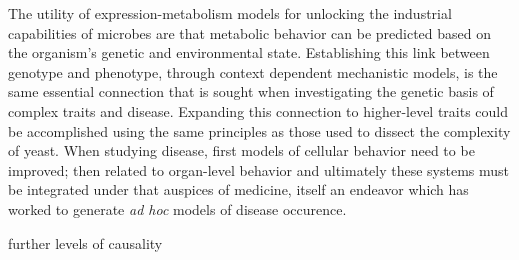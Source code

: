 The utility of expression-metabolism models for unlocking the industrial capabilities of microbes are that metabolic behavior can be predicted based on the organism's genetic and environmental state. Establishing this link between genotype and phenotype, through context dependent mechanistic models, is the same essential connection that is sought when investigating the genetic basis of complex traits and disease. Expanding this connection to higher-level traits could be accomplished using the same principles as those used to dissect the complexity of yeast. When studying disease, first models of cellular behavior need to be improved; then related to organ-level behavior and ultimately these systems must be integrated under that auspices of medicine, itself an endeavor which has worked to generate \textit{ad hoc} models of disease occurence. 

further levels of causality